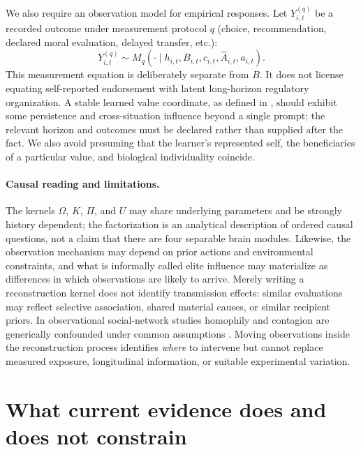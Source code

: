\documentclass[11pt,a4paper]{article}
\begin{document}
We also require an observation model for empirical responses. Let $Y_{i,t}^{(q)}$ be a recorded outcome under measurement protocol $q$ (choice, recommendation, declared moral evaluation, delayed transfer, etc.):
\begin{equation}
 Y_{i,t}^{(q)}\sim M_q(\cdot\mid h_{i,t},B_{i,t},c_{i,t},\widehat A_{i,t},a_{i,t}).\label{eq:measurement}
\end{equation}
This measurement equation is deliberately separate from $B$. It does not license equating self-reported endorsement with latent long-horizon regulatory organization. A stable learned value coordinate, as defined in \citet{zarnckeEmbedded}, should exhibit some persistence and cross-situation influence beyond a single prompt; the relevant horizon and outcomes must be declared rather than supplied after the fact. We also avoid presuming that the learner's represented self, the beneficiaries of a particular value, and biological individuality coincide.

\paragraph{Causal reading and limitations.}
The kernels $\Omega$, $K$, $\Pi$, and $U$ may share underlying parameters and be strongly history dependent; the factorization is an analytical description of ordered causal questions, not a claim that there are four separable brain modules. Likewise, the observation mechanism may depend on prior actions and environmental constraints, and what is informally called elite influence may materialize as differences in which observations are likely to arrive. Merely writing a reconstruction kernel does not identify transmission effects: similar evaluations may reflect selective association, shared material causes, or similar recipient priors. In observational social-network studies homophily and contagion are generically confounded under common assumptions \citep{shalizi2011}. Moving observations inside the reconstruction process identifies \emph{where} to intervene but cannot replace measured exposure, longitudinal information, or suitable experimental variation.

\section{What current evidence does and does not constrain}
\end{document}
